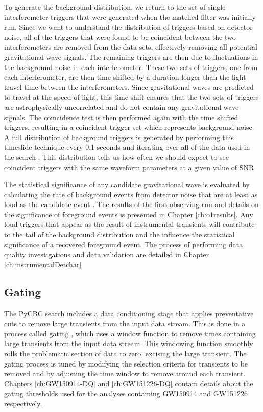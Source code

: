 To generate the background distribution, we return to the set of single interferometer 
triggers that were generated when the matched filter was initially run. Since we want 
to understand the distribution of triggers based on detector noise, all of the triggers 
that were found to be coincident between the two interferometers are removed from the 
data sets, effectively removing all
potential gravitational wave signals. The remaining triggers are then due to fluctuations 
in the background noise in each interferometer. These two sets of triggers,
one from each interferometer, are then time shifted by a duration longer than the
light travel time between the interferometers.
Since gravitational waves are predicted to travel at the speed of light,
this time shift ensures that the
two sets of triggers are astrophysically uncorrelated and do not contain any gravitational
wave signals. The coincidence test is then performed again with the time shifted triggers,
resulting in a coincident trigger set which represents background noise. 
A full distribution of background triggers is generated by performing this timeslide
technique every 0.1 seconds and iterating over all of the data used in the search 
\cite{Usman:2015kfa}. This 
distribution tells us how often we should expect to see coincident triggers with the 
same waveform parameters at a given value of SNR.

The statistical significance of any candidate gravitational wave is
evaluated by calculating the rate of background events from detector noise 
that are at least as
loud as the candidate event \cite{GW150914-CBC}. 
The results of the first observing run and details on 
the significance of foreground events is presented in Chapter \ref{ch:o1results}. 
Any loud triggers that appear as the result of instrumental
transients will contribute to the tail of the background distribution and
the influence the statistical significance of a recovered foreground event.
The process of performing data quality investigations and data validation are 
detailed in Chapter \ref{ch:instrumentalDetchar}

\subsection{Gating}\label{sec:gating}

The PyCBC search includes a data conditioning stage that applies preventative  
cuts to remove large transients from the input data stream. 
This is done in a process called gating \cite{Usman:2015kfa}, which uses a
window function to remove times containing large transients from the input data stream. 
This windowing function smoothly rolls the problematic section of data to zero, excising the large transient.
The gating process is tuned by modifying the selection criteria for transients to be removed and
by adjusting the time window to remove around each transient.
Chapters \ref{ch:GW150914-DQ} and \ref{ch:GW151226-DQ} contain details about the 
gating thresholds used for the analyses containing GW150914 and GW151226 respectively. 

